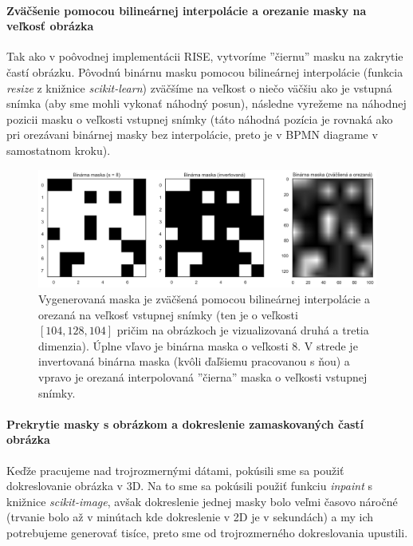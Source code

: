 \paragraph{Zväčšenie pomocou bilineárnej interpolácie a orezanie masky na veľkosť obrázka}

Tak ako v poôvodnej implementácii RISE, vytvoríme ''čiernu'' masku na zakrytie častí obrázku. Pôvodnú binárnu masku pomocou bilineárnej interpolácie (funkcia \textit{resize} z knižnice \textit{scikit-learn}) zväčšíme na veľkost o niečo väčšiu ako je vstupná snímka (aby sme mohli vykonať náhodný posun), následne vyrežeme na náhodnej pozicii masku o veľkosti vstupnej snímky (táto náhodná pozícia je rovnaká ako pri orezávani binárnej masky bez interpolácie, preto je v BPMN diagrame v samostatnom kroku).

\begin{figure}[h!]
    \centering
    \includegraphics[width=13cm]{assets/images/interpolated_mask.png}
    \caption{Vygenerovaná maska je zväčšená pomocou bilineárnej interpolácie a orezaná na veľkosť vstupnej snímky (ten je o veľkosti $[104, 128, 104]$ pričim na obrázkoch je vizualizovaná druhá a tretia dimenzia). Úplne vľavo je binárna maska o veľkosti $8$. V strede je invertovaná binárna maska (kvôli ďaľšiemu pracovanou s ňou) a vpravo je orezaná interpolovaná ''čierna'' maska o veľkosti vstupnej snímky.}
    \label{fig:interpolated_mask}
\end{figure}

\paragraph{Prekrytie masky s obrázkom a dokreslenie zamaskovaných častí obrázka}

Keďže pracujeme nad trojrozmernými dátami, pokúsili sme sa použiť dokreslovanie obrázka v 3D. Na to sme sa pokúsili použiť funkciu \textit{inpaint} s knižnice \textit{scikit-image}, avšak dokreslenie jednej masky bolo veľmi časovo náročné (trvanie bolo až v minútach kde dokreslenie v 2D je v sekundách) a my ich potrebujeme generovať tisíce, preto sme od trojrozmerného dokreslovania upustili.

